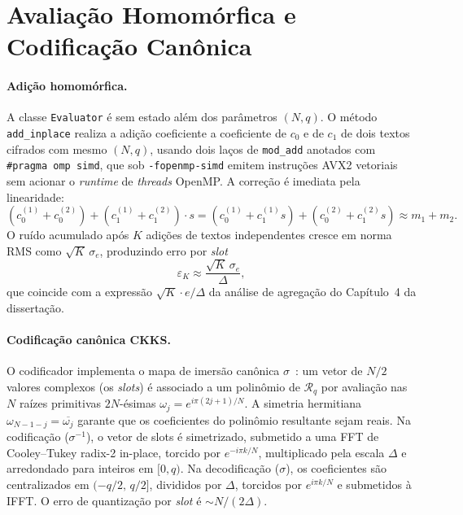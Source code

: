 \documentclass[11pt,a4paper]{article}
\newcommand{\Rq}{\mathcal{R}_q}
\begin{document}
\section{Avaliação Homomórfica e Codificação Canônica}
\label{sec:eval_enc}

\paragraph{Adição homomórfica.}
A classe \texttt{Evaluator} é sem estado além dos parâmetros $(N,q)$. O método
\texttt{add\_inplace} realiza a adição coeficiente a coeficiente de $c_0$ e de $c_1$
de dois textos cifrados com mesmo $(N,q)$, usando dois laços de \texttt{mod\_add}
anotados com \texttt{\#pragma omp simd}, que sob \texttt{-fopenmp-simd} emitem
instruções AVX2 vetoriais sem acionar o \emph{runtime} de \emph{threads} OpenMP. A
correção é imediata pela linearidade:
\[
  (c_0^{(1)}\!+c_0^{(2)}) + (c_1^{(1)}\!+c_1^{(2)})\cdot s
  = (c_0^{(1)}\!+c_1^{(1)}s) + (c_0^{(2)}\!+c_1^{(2)}s) \approx m_1 + m_2.
\]
O ruído acumulado após $K$ adições de textos independentes cresce em norma RMS como
$\sqrt{K}\,\sigma_e$, produzindo erro por \emph{slot}
\begin{equation}
  \varepsilon_K \approx \frac{\sqrt{K}\,\sigma_e}{\Delta},
  \label{eq:noise}
\end{equation}
que coincide com a expressão $\sqrt{K}\cdot e/\Delta$ da análise de agregação do
Capítulo~4 da dissertação.

\paragraph{Codificação canônica CKKS.}
O codificador implementa o mapa de imersão canônica $\sigma$~\cite{Cheon2017}: um vetor
de $N/2$ valores complexos (os \emph{slots}) é associado a um polinômio de $\Rq$ por
avaliação nas $N$ raízes primitivas $2N$-ésimas $\omega_j = e^{i\pi(2j+1)/N}$. A
simetria hermitiana $\omega_{N-1-j} = \overline{\omega_j}$ garante que os coeficientes
do polinômio resultante sejam reais. Na codificação ($\sigma^{-1}$), o vetor de slots é
simetrizado, submetido a uma FFT de Cooley--Tukey radix-2 in-place, torcido por
$e^{-i\pi k/N}$, multiplicado pela escala $\Delta$ e arredondado para inteiros em
$[0,q)$. Na decodificação ($\sigma$), os coeficientes são centralizados em
$(-q/2,\,q/2]$, divididos por $\Delta$, torcidos por $e^{i\pi k/N}$ e submetidos à
IFFT. O erro de quantização por \emph{slot} é $\sim N/(2\Delta)$.
\end{document}
